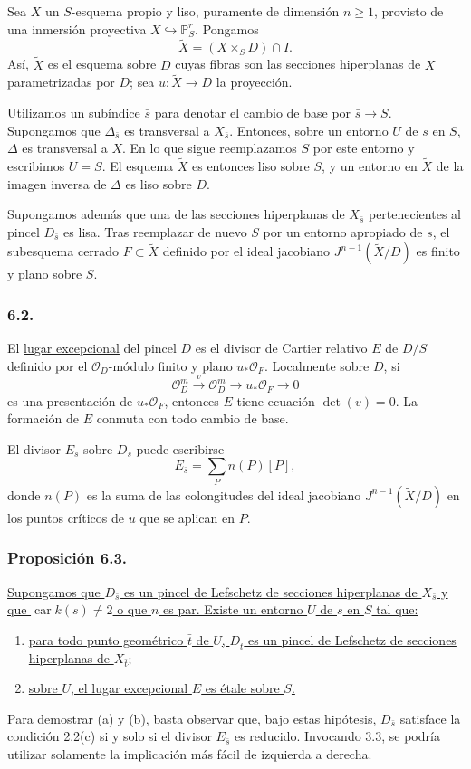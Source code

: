 Sea $X$ un $S$-esquema propio y liso, puramente de dimensión
$n\geq1$, provisto de una inmersión proyectiva
$X\hookrightarrow\mathbb P^r_S$. Pongamos
\[
\widetilde X=(X\times_SD)\cap I.
\]
Así, $\widetilde X$ es el esquema sobre $D$ cuyas fibras son las
secciones hiperplanas de $X$ parametrizadas por $D$; sea
$u:\widetilde X\to D$ la proyección.

Utilizamos un subíndice $\bar s$ para denotar el cambio de base por
$\bar s\to S$. Supongamos que $\Delta_{\bar s}$ es transversal a
$X_{\bar s}$. Entonces, sobre un entorno $U$ de $s$ en $S$,
$\Delta$ es transversal a $X$. En lo que sigue reemplazamos $S$ por
este entorno y escribimos $U=S$. El esquema $\widetilde X$ es
entonces liso sobre $S$, y un entorno en $\widetilde X$ de la imagen
inversa de $\Delta$ es liso sobre $D$.

Supongamos además que una de las secciones hiperplanas de
$X_{\bar s}$ pertenecientes al pincel $D_{\bar s}$ es lisa. Tras
reemplazar de nuevo $S$ por un entorno apropiado de $s$, el subesquema
cerrado $F\subset\widetilde X$ definido por el ideal jacobiano
$J^{n-1}(\widetilde X/D)$ es finito y plano sobre $S$.

\pageoriginale

\subsubsection*{6.2.}
El \underline{lugar excepcional} del pincel $D$ es el divisor de
Cartier relativo $E$ de $D/S$ definido por el
$\mathcal O_D$-módulo finito y plano $u_*\mathcal O_F$. Localmente
sobre $D$, si
\[
\mathcal O_D^m\xrightarrow{\ v\ }\mathcal O_D^m
\longrightarrow u_*\mathcal O_F\longrightarrow0
\]
es una presentación de $u_*\mathcal O_F$, entonces $E$ tiene ecuación
$\det(v)=0$. La formación de $E$ conmuta con todo cambio de base.

El divisor $E_{\bar s}$ sobre $D_{\bar s}$ puede escribirse
\[
E_{\bar s}=\sum_Pn(P)[P],
\]
donde $n(P)$ es la suma de las colongitudes del ideal jacobiano
$J^{n-1}(\widetilde X/D)$ en los puntos críticos de $u$ que se
aplican en $P$.

\subsubsection*{Proposición 6.3.}
\underline{Supongamos que $D_{\bar s}$ es un pincel de Lefschetz de
secciones hiperplanas de $X_{\bar s}$ y que
$\operatorname{car}k(s)\ne2$ o que $n$ es par. Existe un entorno $U$
de $s$ en $S$ tal que:}
\begin{enumerate}
\item[(a)] \underline{para todo punto geométrico $\bar t$ de $U$,
$D_{\bar t}$ es un pincel de Lefschetz de secciones hiperplanas de
$X_{\bar t}$;}
\item[(b)] \underline{sobre $U$, el lugar excepcional $E$ es étale
sobre $S$.}
\end{enumerate}
Para demostrar (a) y (b), basta observar que, bajo estas hipótesis,
$D_{\bar s}$ satisface la condición 2.2(c) si y solo si el divisor
$E_{\bar s}$ es reducido. Invocando 3.3, se podría utilizar solamente
la implicación más fácil de izquierda a derecha.

